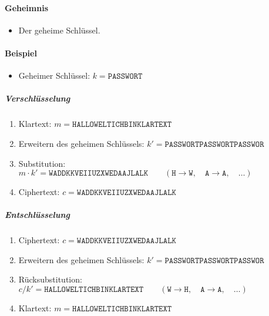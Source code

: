                 \paragraph{Geheimnis}
                    \begin{itemize}
                    	\item Der geheime Schlüssel.
                    \end{itemize}
                
                \paragraph{Beispiel}
                    \begin{itemize}
                    	\item Geheimer Schlüssel: \( k = \texttt{PASSWORT} \)
                    \end{itemize}
                
                    \subparagraph{Verschlüsselung}
	                    \begin{enumerate}
	                    	\item[] Klartext: \( m = \texttt{HALLOWELTICHBINKLARTEXT} \)
	                    	\item Erweitern des geheimen Schlüssels: \( k' = \texttt{PASSWORTPASSWORTPASSWOR} \)
	                    	\item Substitution: \( m \cdot k' = \texttt{WADDKKVEIIUZXWEDAAJLALK} \qquad(\texttt{H} \rightarrow \texttt{W}, \quad\texttt{A} \rightarrow \texttt{A}, \quad\dots) \)
	                    	\item[] Ciphertext: \( c = \texttt{WADDKKVEIIUZXWEDAAJLALK} \)
	                    \end{enumerate}
                    
                    \subparagraph{Entschlüsselung}
	                    \begin{enumerate}
	                    	\item[] Ciphertext: \( c = \texttt{WADDKKVEIIUZXWEDAAJLALK} \)
	                    	\item Erweitern des geheimen Schlüssels: \( k' = \texttt{PASSWORTPASSWORTPASSWOR} \)
	                    	\item Rücksubstitution: \( c / k' = \texttt{HALLOWELTICHBINKLARTEXT} \qquad(\texttt{W} \rightarrow \texttt{H}, \quad\texttt{A} \rightarrow \texttt{A}, \quad\dots) \)
	                    	\item[] Klartext: \( m = \texttt{HALLOWELTICHBINKLARTEXT} \)
	                    \end{enumerate}

